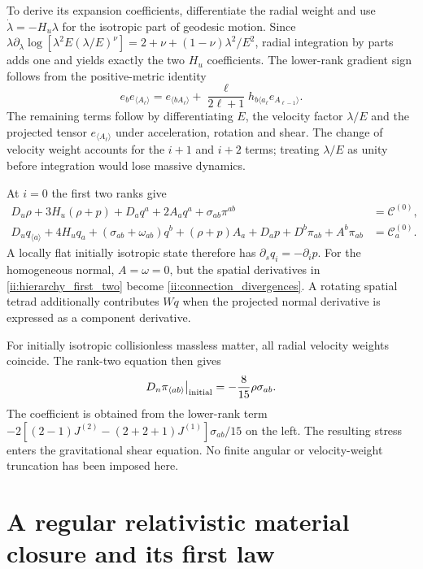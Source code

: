 To derive its expansion coefficients, differentiate the radial weight and use $\dot\lambda=-H_u\lambda$ for the isotropic part of geodesic motion. Since
$\lambda\partial_\lambda\log[\lambda^2E(\lambda/E)^\nu]
=2+\nu+(1-\nu)\lambda^2/E^2$, radial integration by parts adds one and yields exactly the two $H_u$ coefficients. The lower-rank gradient sign follows from the positive-metric identity
\begin{equation}
 e_be_{\langle A_\ell\rangle}
 =e_{\langle bA_\ell\rangle}
 +\frac\ell{2\ell+1}h_{b\langle a_\ell}e_{A_{\ell-1}\rangle}.
 \label{ii:pstf_product}
\end{equation}
The remaining terms follow by differentiating $E$, the velocity factor $\lambda/E$ and the projected tensor $e_{\langle A_\ell\rangle}$ under acceleration, rotation and shear. The change of velocity weight accounts for the $i+1$ and $i+2$ terms; treating $\lambda/E$ as unity before integration would lose massive dynamics.

At $i=0$ the first two ranks give
\begin{align}
 D_u\rho+3H_u(\rho+p)+D_aq^a+2A_aq^a+\sigma_{ab}\pi^{ab}&=\mathcal C^{(0)},\nonumber\\
 D_uq_{\langle a\rangle}+4H_uq_a+(\sigma_{ab}+\omega_{ab})q^b
 +(\rho+p)A_a+D_ap+D^b\pi_{ab}+A^b\pi_{ab}&=\mathcal C^{(0)}_a.
 \label{ii:hierarchy_first_two}
\end{align}
A locally flat initially isotropic state therefore has $\partial_sq_i=-\partial_ip$. For the homogeneous normal, $A=\omega=0$, but the spatial derivatives in \eqref{ii:hierarchy_first_two} become \eqref{ii:connection_divergences}. A rotating spatial tetrad additionally contributes $Wq$ when the projected normal derivative is expressed as a component derivative.

For initially isotropic collisionless massless matter, all radial velocity weights coincide. The rank-two equation then gives
\begin{equation}
 D_n\pi_{\langle ab\rangle}\big|_{\rm initial}=-\frac8{15}\rho\sigma_{ab}.
 \label{ii:initial_anisotropic_stress}
\end{equation}
The coefficient is obtained from the lower-rank term
$-2[(2-1)J^{(2)}-(2+2+1)J^{(1)}]\sigma_{ab}/15$ on the left. The resulting stress enters the gravitational shear equation. No finite angular or velocity-weight truncation has been imposed here.


\section{A regular relativistic material closure and its first law}

